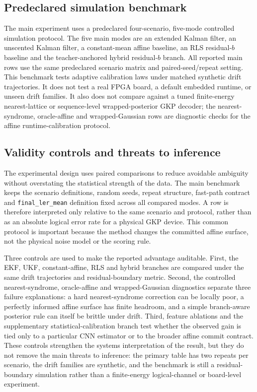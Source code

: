 \documentclass[11pt]{article}
\newcommand{\softwarehil}{controlled simulation}
\newcommand{\finalLER}{\texttt{final\_ler\_mean}}
\begin{document}
\subsection{Predeclared simulation benchmark}

The main experiment uses a predeclared four-scenario, five-mode \softwarehil{}
protocol.  The five main modes are an extended Kalman filter, an unscented
Kalman filter, a constant-mean affine baseline, an RLS residual-\(b\) baseline
and the teacher-anchored hybrid residual-\(b\) branch.  All reported main
rows use the same predeclared scenario matrix and paired-seed/repeat setting.
This benchmark tests adaptive calibration laws under matched synthetic drift
trajectories.  It does not test a real FPGA board, a default embedded runtime,
or unseen drift families.  It also does not compare against a tuned
finite-energy nearest-lattice or sequence-level wrapped-posterior GKP decoder;
the nearest-syndrome, oracle-affine and wrapped-Gaussian rows are diagnostic
checks for the affine runtime-calibration protocol.

\subsection{Validity controls and threats to inference}

The experimental design uses paired comparisons to reduce avoidable ambiguity
without overstating the statistical strength of the data.  The main benchmark
keeps the scenario definitions, random seeds, repeat structure, fast-path
contract and \finalLER{} definition fixed across all compared modes.  A row is
therefore interpreted only relative to the same scenario and protocol, rather
than as an absolute logical error rate for a physical GKP device.  This common
protocol is important because the method changes the committed affine surface,
not the physical noise model or the scoring rule.

Three controls are used to make the reported advantage auditable.  First, the
EKF, UKF, constant-affine, RLS and hybrid branches are compared under the same
drift trajectories and residual-boundary metric.  Second, the controlled
nearest-syndrome, oracle-affine and wrapped-Gaussian diagnostics separate three
failure explanations: a hard nearest-syndrome correction can be locally poor, a
perfectly informed affine surface has finite headroom, and a simple
branch-aware posterior rule can itself be brittle under drift.  Third, feature
ablations and the supplementary statistical-calibration branch test whether the
observed gain is tied only to a particular CNN estimator or to the broader
affine commit contract.  These controls strengthen the systems interpretation
of the result, but they do not remove the main threats to inference: the
primary table has two repeats per scenario, the drift families are synthetic,
and the benchmark is still a residual-boundary simulation rather than a
finite-energy logical-channel or board-level experiment.
\end{document}
